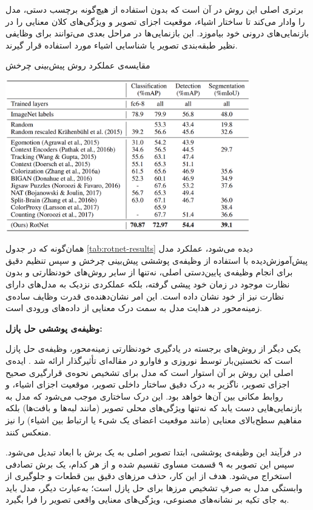 برتری اصلی این روش در آن است که بدون استفاده از هیچ‌گونه برچسب دستی، مدل را وادار می‌کند تا ساختار اشیاء، موقعیت اجزای تصویر و ویژگی‌های کلان معنایی را در بازنمایی‌های درونی خود بیاموزد. این بازنمایی‌ها در مراحل بعدی می‌توانند برای وظایفی نظیر طبقه‌بندی تصویر یا شناسایی اشیاء مورد استفاده قرار گیرند.

\begin{table}[htbp]
\centering
\caption{مقایسه‌ی عملکرد روش پیش‌بینی چرخش }
\includegraphics[width=0.8\textwidth]{Images/Chapter2/rotnet-results.png}
\label{tab:rotnet-results}
\end{table}

همان‌گونه که در جدول
\ref{tab:rotnet-results}
دیده می‌شود، عملکرد مدل پیش‌آموزش‌دیده با استفاده از وظیفه‌ی پوششی پیش‌بینی چرخش و سپس تنظیم دقیق برای انجام وظیفه‌ی پایین‌دستی اصلی، نه‌تنها از سایر روش‌های خودنظارتی و بدون نظارت موجود در زمان خود پیشی گرفته، بلکه عملکردی نزدیک به مدل‌های دارای نظارت نیز از خود نشان داده است. این امر نشان‌دهنده‌ی قدرت وظایف ساده‌ی زمینه‌محور در هدایت مدل به سمت درک معنایی از داده‌های ورودی است.\newline

\noindent\textbf{وظیفه‌ی پوششی حل پازل:}

یکی دیگر از روش‌های برجسته در یادگیری خودنظارتی زمینه‌محور، وظیفه‌ی حل پازل است که نخستین‌بار توسط نوروزی و فاوارو در مقاله‌ای تأثیرگذار ارائه شد \cite{noroozi2016unsupervised}. ایده‌ی اصلی این روش بر آن استوار است که مدل برای تشخیص نحوه‌ی قرارگیری صحیح اجزای تصویر، ناگزیر به درک دقیق ساختار داخلی تصویر، موقعیت اجزای اشیاء، و روابط مکانی بین آن‌ها خواهد بود. این درک ساختاری موجب می‌شود که مدل به بازنمایی‌هایی دست یابد که نه‌تنها ویژگی‌های محلی تصویر (مانند لبه‌ها و بافت‌ها) بلکه مفاهیم سطح‌بالای معنایی (مانند موقعیت اعضای یک شیء یا ارتباط بین اشیاء) را نیز منعکس کنند.

در فرآیند این وظیفه‌ی پوششی، ابتدا تصویر اصلی به یک برش با ابعاد  تبدیل می‌شود. سپس این تصویر به ۹ قسمت مساوی  تقسیم شده و از هر کدام، یک برش تصادفی  استخراج می‌شود. هدف از این کار، حذف مرزهای دقیق بین قطعات و جلوگیری از وابستگی مدل به صرفِ تشخیص مرزها برای حل پازل است؛ به‌عبارت دیگر، مدل باید به جای تکیه بر نشانه‌های مصنوعی، ویژگی‌های معنایی واقعی تصویر را فرا بگیرد.

